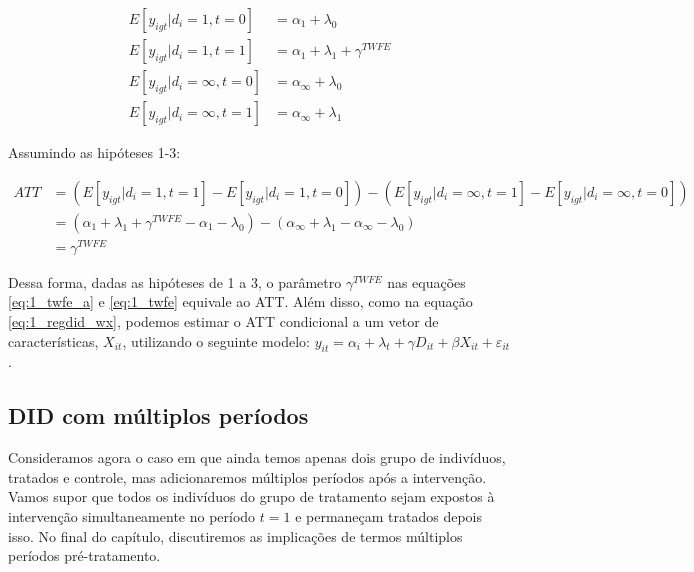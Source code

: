 \documentclass[portugues]{article}
\begin{document}
\[
\begin{split}
    E[y_{igt} | d_i=1, t=0] & = \alpha_1 + \lambda_0 \\
    E[y_{igt} | d_i=1, t=1] & = \alpha_1 + \lambda_1 + \gamma^{TWFE} \\
    E[y_{igt} | d_i=\infty, t=0] & = \alpha_\infty + \lambda_0 \\
    E[y_{igt} | d_i=\infty, t=1] & = \alpha_\infty + \lambda_1
\end{split}
\]

Assumindo as hipóteses 1-3:

\begin{equation*}
\begin{split}
    ATT &= (E[y_{igt} | d_i=1, t=1] - E[y_{igt} | d_i=1, t=0]) - (E[y_{igt} | d_i=\infty, t=1] - E[y_{igt} | d_i=\infty, t=0]) \\
    & = (\alpha_1 + \lambda_1 + \gamma^{TWFE} - \alpha_1 - \lambda_0) - (\alpha_\infty + \lambda_1 -  \alpha_\infty - \lambda_0) \\
    & = \gamma^{TWFE}
\end{split}
\end{equation*}

Dessa forma, dadas as hipóteses de 1 a 3, o parâmetro $\gamma^{TWFE}$ nas equações \eqref{eq:1_twfe_a} e \eqref{eq:1_twfe} equivale ao ATT.  Além disso, como na equação \eqref{eq:1_regdid_wx}, podemos estimar o ATT condicional a um vetor de características, $X_{it}$, utilizando o seguinte modelo:
$y_{it} = \alpha_{i} + \lambda_t + \gamma D_{it} + \beta X_{it} + \varepsilon_{it}$ \citep{angrist2009mostly}.

\subsection{DID com múltiplos períodos}

Consideramos agora o caso em que ainda temos apenas dois grupo de indivíduos, tratados e controle, mas adicionaremos múltiplos períodos após a intervenção. Vamos supor que todos os indivíduos do grupo de tratamento sejam expostos à intervenção simultaneamente no período $t = 1$ e permaneçam tratados depois isso. No final do capítulo, discutiremos as implicações de termos múltiplos períodos pré-tratamento.
\end{document}
